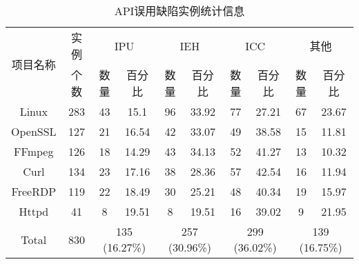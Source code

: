 \begin{table}[b]
	\centering
	\begin{minipage}[t]{\linewidth} %
		\caption{API误用缺陷实例统计信息}
		\label{tab:2-3-root-causes}
		\begin{tabular}{cccccccccc}
			\hline
			\multirow{2}{*}{项目名称} & 实例 & \multicolumn{2}{c}{IPU}& \multicolumn{2}{c}{IEH}& \multicolumn{2}{c}{ICC}& \multicolumn{2}{c}{其他}\\
			\cline{3-10}
			& 个数 & 数量 & 百分比 & 数量& 百分比 & 数量& 百分比& 数量& 百分比 \\
			\hline
			Linux  & 283 & 43 & 15.1 & {96} & {33.92} & 77 & 27.21 & 67 & 23.67 \\
			OpenSSL  & 127 & 21 & 16.54 & 42 & 33.07 & {49} & {38.58} & 15 & 11.81 \\ 
			FFmpeg  & 126  &  18 & 14.29 & 43 & 34.13 & 52 & 41.27 & 13 & 10.32 \\
			Curl  & 134   & 23 & 17.16 & 38 & 28.36 & 57 & 42.54 & 16 & 11.94 \\ 
			FreeRDP   & 119 & 22 & 18.49 & 30 & 25.21 & 48 & 40.34 & 19 & 15.97 \\ 
			Httpd  & 41 & 8 & 19.51 & 8 & 19.51 & 16 & 39.02 & 9 & 21.95 \\ 
			\hline
			Total  & 830 & \multicolumn{2}{c}{135 (16.27\%)} & \multicolumn{2}{c}{257 (30.96\%)} & \multicolumn{2}{c}{299 (36.02\%)} & \multicolumn{2}{c}{139 (16.75\%)}\\ 
			\hline
		\end{tabular}
	\end{minipage}
\end{table}